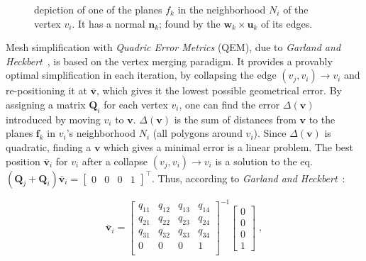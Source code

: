 \begin{figure}[h]
\begin{minipage}{0.485\textwidth}
        \caption{depiction of one of the planes \(f_k\) in the neighborhood \(N_i\) of the vertex \(v_i\). It has a normal \(\mathbf{n}_k\); found by the \(\mathbf{w}_k \times \mathbf{u}_k\) of its edges.}
        \label{fig:quadrics}
    \end{minipage}
\end{figure}

\vspace{-0.7em}

Mesh simplification with \emph{Quadric Error Metrics} (QEM), due to \emph{Garland and Heckbert}~\cite{garland1997surface}, is based on the vertex merging paradigm. It provides a provably optimal simplification in each iteration, by collapsing the edge \((v_j, v_i) \rightarrow v_i\) and re-positioning it at \(\mathbf{\bar{v}}\), which gives it the lowest possible geometrical error. By assigning a matrix \(\mathbf{Q}_i\) for each vertex \(v_i\), one can find the error \(\Delta(\mathbf{v})\) introduced by moving \(v_i\) to \(\mathbf{v}\). \(\Delta(\mathbf{v})\) is the sum of distances from \(\mathbf{v}\) to the planes \(\mathbf{f}_k\) in \(v_i\)'s neighborhood \(N_i\) (all polygons around \(v_i\)). Since \(\Delta(\mathbf{v})\) is quadratic, finding a \(\mathbf{v}\) which gives a minimal error is a linear problem. The best position \(\mathbf{\bar{v}}_i\) for \(v_i\) after a collapse \((v_j, v_i) \rightarrow v_i\) is a solution to the eq. \((\mathbf{Q}_j + \mathbf{Q}_i)\mathbf{\bar{v}}_i = \begin{bmatrix} 0 & 0 & 0 & 1 \end{bmatrix}^\intercal\). Thus, according to \emph{Garland and Heckbert}~\cite{garland1997surface}:

    \begin{equation} \bar{\mathbf{v}}_i = \begin{bmatrix}
    q_{11} & q_{12} & q_{13} & q_{14}\\
    q_{21} & q_{22} & q_{23} & q_{24}\\
    q_{31} & q_{32} & q_{33} & q_{34}\\
    0 & 0 & 0 & 1\\
\end{bmatrix}^{-1} \begin{bmatrix} 0 \\
                                   0 \\
                                   0 \\
    1 \end{bmatrix} \; ,\end{equation}

